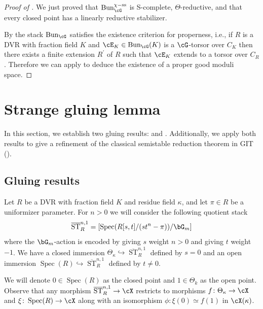 \documentclass[a4paper]{amsart}
\numberwithin{equation}{section}
\theoremstyle{plain}
\theoremstyle{definition}
\DeclareMathOperator{\Spec}{Spec}
\DeclareMathOperator{\ST}{ST}
\DeclareMathOperator{\Bun}{Bun}
\newcommand{\co}{\colon}
\renewcommand{\ss}{{\rm ss}}
\def\oST{\overline{\ST}}
\begin{document}
\begin{proof}[Proof of ] 
	We just proved that $\Bun_{\cG}^{\chi-\ss}$ is  {\textsf{S}}-complete, $\Theta$-reductive, and that every closed point has a linearly reductive stabilizer.

	By \cite[Prop.~3.3]{heinloth-stability} the stack $\Bun_{\cG}$ satisfies the existence criterion for properness, i.e., if $R$ is a DVR with fraction field $K$ and $\cE_K\in \Bun_{\cG}(K)$ is a $\cG$-torsor over $C_K$ then there exists a finite extension $R^\prime$ of $R$ such that $\cE_K$ extends to a torsor over $C_R$.  Therefore we can apply  to deduce the existence of a proper good moduli space.
\end{proof}











\appendix


\section{Strange gluing lemma}

In this section, we establish two gluing results:   and .  Additionally, we apply both results to give a refinement of the classical semistable reduction theorem in GIT ().

\subsection{Gluing results}

Let $R$ be a DVR with fraction field $K$ and residue field $\kappa$, and let $\pi \in R$ be a uniformizer parameter. For $n>0$ we will consider the following quotient stack
\[
\oST_R^{n,1} = [\Spec(R[s,t]/(s t^n - \pi)) / \bG_m]
\]
where the $\bG_m$-action is encoded by giving $s$ weight $n>0$ and giving $t$ weight $-1$. We have a closed immersion $\Theta_{\kappa} \hookrightarrow \oST^{n,1}_R$ defined by $s = 0$ and an open immersion $\Spec(R)  \hookrightarrow \oST_R^{n,1}$ defined by $t \neq 0$. 

We will denote $0 \in \Spec(R)$ as the closed point and $1 \in \Theta_k$ as the open point.  Observe that any morphism  $\oST^{n,1}_R \to \cX$ restricts to morphisms $f \co \Theta_\kappa \to \cX$ and $\xi \co \Spec(R) \to \cX$ along with an isomorphism $\phi \co \xi(0) \simeq f(1)$ in $\cX(\kappa)$. 
\end{document}
